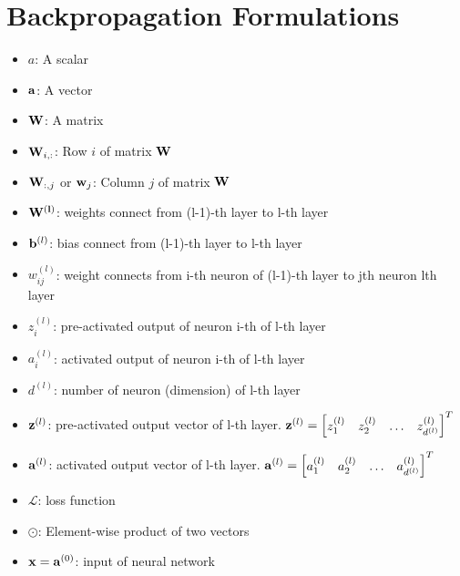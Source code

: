 \documentclass[14pt, a4paper]{article}
\numberwithin{equation}{section}
\numberwithin{algorithm}{section}
\numberwithin{figure}{section}
\begin{document}
\section{Backpropagation Formulations}

\begin{itemize}
  \item $a$: A scalar
    \item $\bold{a}$: A vector
    \item $\bold{W}$: A matrix
     \item $\bold{W}_{i,:}$: Row $i$ of matrix $\bold{W}$
      \item $\bold{W}_{:,j}$ or $\bold{w}_j$: Column $j$ of matrix $\bold{W}$
       \item $\bold{W^{(l)}}$: weights connect from (l-1)-th layer to l-th layer
      \item $\bold{b}^{(l)}$: bias connect from (l-1)-th layer to l-th layer
      \item $w_{ij}^{(l)}$: weight connects from i-th neuron of (l-1)-th layer to jth neuron lth layer
      \item $z_{i}^{(l)}$: pre-activated output of neuron i-th of l-th layer
      \item $a_{i}^{(l)}$: activated output of neuron i-th of l-th layer
      \item $d^{(l)}$: number of neuron (dimension) of l-th layer
      \item $\bold{z}^{(l)}$: pre-activated output vector of l-th layer. $\bold{z}^{(l)} = \begin{bmatrix} z_1^{(l)} & z_2^{(l)} & \dots & z_{d^{(l)}}^{(l)}\end{bmatrix}^T$
      \item $\bold{a}^{(l)}$: activated output vector of l-th layer. $\bold{a}^{(l)} = \begin{bmatrix} a_1^{(l)} & a_2^{(l)} &\dots & a_{d^{(l)}}^{(l)}\end{bmatrix}^T$
      \item $\mathcal{L}$: loss function
      \item $\odot$: Element-wise product of two vectors
      \item $\bold{x}=\bold{a}^{(0)}$: input of neural network
\end{itemize}
\end{document}
